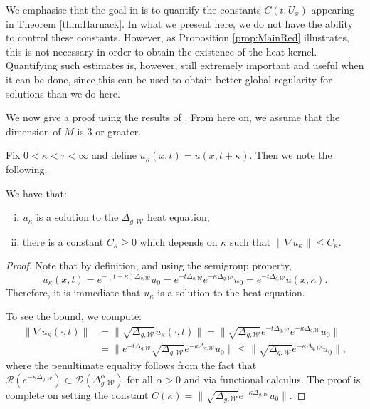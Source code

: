 \documentclass[AMS,STIX1COL]{WileyNJD-v2}
\numberwithin{equation}{section}
\renewcommand{\~}{\tilde}
\renewcommand{\-}{\bar}
\newcommand{\8}{\infty}
\newcommand{\cW}{\mathcal{W}}
\newcommand{\dom}{ {\mathcal{D}}}
\newcommand{\ran}{ {\mathcal{R}}}
\newcommand{\norm}[1]{\| #1 \|}			%
\begin{document}
We emphasise that the goal in \cite{SC}
is to quantify the constants $C(t,U_x)$
appearing in Theorem \ref{thm:Harnack}. In what we present here, we do not have
the ability to control these constants. However, as
Proposition \ref{prop:MainRed} illustrates, this is not necessary 
in order to obtain the existence of the heat kernel.
Quantifying such estimates is, however, still 
extremely important and useful when it can be done, 
since this can be used to obtain better global regularity for
solutions than we do here.

We now give a proof using the results of \cite{CS}.
From here on, we assume that the dimension of $M$ is $3$ or greater. 

Fix $0 < \kappa < \tau < \infty$ and 
define $u_\kappa(x,t) = u(x,t+\kappa)$. Then we note the following. 
\begin{lemma}
\label{lem:shiftsol}
We have that: 
\begin{enumerate}[(i)] 
\item $u_\kappa$ is a solution to the $\Delta_{g,\cW}$ heat equation, 
\item there is a constant $C_\kappa \geq 0$
	which depends on $\kappa$ 
	such that $\norm{\nabla u_\kappa} \leq C_\kappa$.
\end{enumerate} 
\end{lemma}
\begin{proof}
Note that by definition, and using the semigroup property, 
$$u_\kappa(x,t) = e^{-(t + \kappa)\Delta_{g,\cW}} u_0 
	=e^{-t \Delta_{g,\cW}}e^{-\kappa\Delta_{g,\cW}}u_0
	=e^{-t \Delta_{g,\cW}}u(x,\kappa).$$ 
Therefore, it is immediate that $u_\kappa$ is a solution
to the heat equation. 

To see the bound, we compute: 
\begin{align*}
\norm{ \nabla u_\kappa(\cdot, t)} 
	&= \norm{ \sqrt{\Delta_{g,\cW}} u_\kappa(\cdot, t)} 
	= \norm{ \sqrt{\Delta_{g,\cW}} e^{-t\Delta_{g,\cW}} e^{-\kappa \Delta_{g,\cW}}u_0} \\
	&= \norm{ e^{-t \Delta_{g,\cW}} \sqrt{ \Delta_{g,\cW}} e^{-\kappa \Delta_{g,\cW}}u_0}
	\leq \norm{\sqrt{ \Delta_{g,\cW}} e^{-\kappa \Delta_{g,\cW}}u_0},
\end{align*}
where the penultimate equality follows from the fact that
$\ran(e^{-\kappa \Delta_{g,\cW}}) \subset \dom(\Delta_{g,\cW}^\alpha)$
for all $\alpha > 0$ and via functional calculus.
The proof is complete on setting the constant 
$C(\kappa) = \norm{\sqrt{ \Delta_{g,\cW}} e^{-\kappa \Delta_{g,\cW}}u_0}$.
\end{proof}
\end{document}
